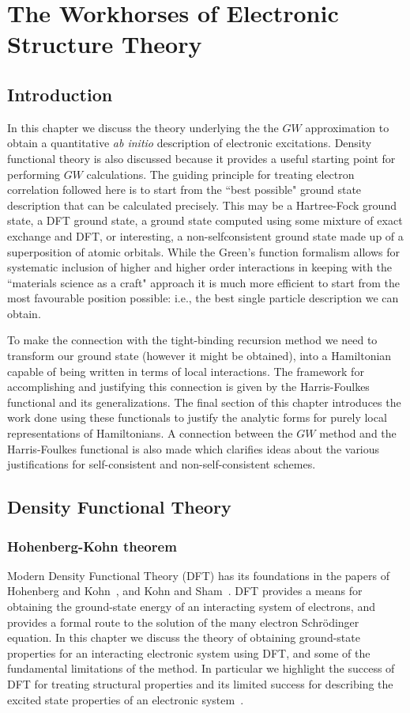 \chapter{The Workhorses of Electronic Structure Theory}
\label{chap:gw}
\noindent
\section{Introduction}
In this chapter we discuss the theory underlying the 
the $GW$ approximation to obtain a quantitative {\it ab initio} 
description of electronic excitations. Density functional theory
is also discussed because it provides a useful starting point for
performing $GW$ calculations. The guiding principle for treating electron 
correlation followed here is to start from the ``best possible" ground state description
that can be calculated precisely. This may be a Hartree-Fock ground state,
a DFT ground state, a ground state computed using some mixture of exact exchange
and DFT, or interesting, a non-selfconsistent ground state made up of a superposition
of atomic orbitals. While the Green's function formalism allows for systematic
inclusion of higher and higher order interactions in keeping with the ``materials
science as a craft" approach it is much more efficient to start from the most 
favourable position possible: i.e., the best single particle description we can obtain.

To make the connection with the tight-binding recursion method 
we need to transform our ground state (however it might be obtained), into a
Hamiltonian capable of being written in terms of local interactions. The
framework for accomplishing and justifying this connection is given by the Harris-Foulkes
functional and its generalizations. The final section of this chapter
introduces the work done using these functionals to justify
the analytic forms for purely local representations of Hamiltonians.
A connection between the $GW$ method and the Harris-Foulkes functional 
is also made which clarifies ideas about the various justifications 
for self-consistent and non-self-consistent schemes.

\section{Density Functional Theory}
\subsection{Hohenberg-Kohn theorem}
Modern Density Functional Theory (DFT) has its foundations in the 
papers of Hohenberg and Kohn~\cite{hohenbergkohn64}, and Kohn and Sham~\cite{kohnsham65}.
DFT provides a means for obtaining the ground-state energy of an
interacting system of electrons, and provides a formal
route to the solution of the many electron Schr\"odinger equation.
In this chapter we discuss the theory of obtaining ground-state 
properties for an interacting electronic system using DFT, and 
some of the fundamental limitations of the method. In 
particular we highlight the success of DFT for treating structural 
properties and its limited success for describing the excited
state properties of an electronic system~\cite{martin}.

